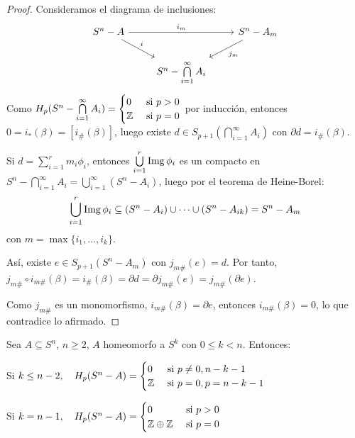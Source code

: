 \begin{proof}
  Consideramos el diagrama de inclusiones:
  \[ \begin{tikzcd}
    S^n - A \arrow{dr}{i} \arrow{rr}{i_m} & & S^n - A_m \arrow{dl}{j_m} \\
    & S^n - \bigcap\limits_{i = 1}^\infty A_i
  \end{tikzcd} \]
  Como $H_p(S^n - \bigcap\limits_{i = 1}^\infty A_i) = \begin{cases} 0 &\text{ si } p > 0 \\ \mathbb{Z} &\text{ si } p = 0 \end{cases}$ por inducción, entonces
  $0 = i_*(\beta) = [i_\#(\beta)]$, luego existe $d \in S_{p+1}(\bigcap\limits_{i = 1}^\infty A_i)$ con $\partial d = i_\#(\beta)$.

  Si $d = \sum\limits_{i = 1}^r m_i \phi_i$, entonces $\bigcup\limits_{i = 1}^r \operatorname{Img} \phi_i$ es un compacto en $S^n - \bigcap\limits_{i = 1}^\infty A_i
  = \bigcup\limits_{i = 1}^\infty (S^n - A_i)$, luego por el teorema de Heine-Borel:
  \[\bigcup\limits_{i = 1}^r \operatorname{Img} \phi_i \subseteq (S^n - A_i) \cup \dots \cup (S^n - A_{ik}) = S^n - A_m \]
  con $m = \max\{i_1, \dots, i_k\}$.

  Así, existe $e \in S_{p+1}(S^n - A_m)$ con $j_{m\#}(e) = d$. Por tanto, $j_{m\#} \circ i_{m\#} (\beta) = i_\#(\beta) = \partial d
  = \partial j_{m\#}(e) = j_{m\#}(\partial e)$.

  Como $j_{m\#}$ es un monomorfismo, $i_{m\#}(\beta) = \partial e$, entonces $i_{m\#}(\beta) = 0$, lo que contradice lo afirmado.
\end{proof}

\begin{theorem}
  Sea $A \subseteq S^n$, $n \geq 2$, $A$ homeomorfo a $S^k$ con $0 \leq k < n$. Entonces:

  Si $k \leq n-2, \quad H_p(S^n - A) = \begin{cases} 0 &\text{ si } p \neq 0, n-k-1 \\ \mathbb{Z} &\text{ si } p = 0, p = n-k-1 \end{cases}$

  Si $k = n-1, \quad    H_p(S^n - A) = \begin{cases} 0 &\text{ si } p > 0 \\ \mathbb{Z} \oplus \mathbb{Z} &\text{ si } p = 0 \end{cases}$
\end{theorem}

